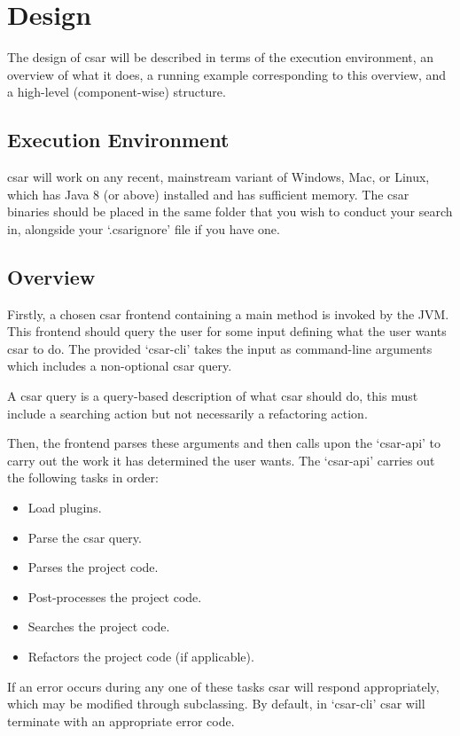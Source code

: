 \documentclass[12pt, letterpaper]{article}
\begin{document}
\section{Design}

The design of csar will be described in terms of the execution environment, an overview of what it does, a running example corresponding to this overview, and a high-level (component-wise) structure.

\subsection{Execution Environment}
csar will work on any recent, mainstream variant of Windows, Mac, or Linux, which has Java 8 (or above) installed and has sufficient memory.
The csar binaries should be placed in the same folder that you wish to conduct your search in, alongside your `.csarignore' file if you have one.

\subsection{Overview}
Firstly, a chosen csar frontend containing a main method is invoked by the JVM.
This frontend should query the user for some input defining what the user wants csar to do.
The provided `csar-cli' takes the input as command-line arguments which includes a non-optional csar query.

A csar query is a query-based description of what csar should do, this must include a searching action but not necessarily a refactoring action.

Then, the frontend parses these arguments and then calls upon the `csar-api' to carry out the work it has determined the user wants.
The `csar-api' carries out the following tasks in order:
\begin{itemize}
  \item Load plugins.
  \item Parse the csar query.
  \item Parses the project code.
  \item Post-processes the project code.
  \item Searches the project code.
  \item Refactors the project code (if applicable).
\end{itemize}
If an error occurs during any one of these tasks csar will respond appropriately, which may be modified through subclassing.
By default, in `csar-cli' csar will terminate with an appropriate error code.
\end{document}
